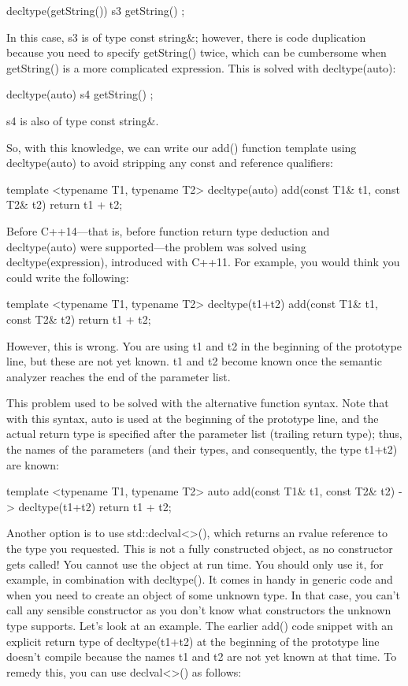 \begin{cpp}
decltype(getString()) s3 { getString() };
\end{cpp}

In this case, s3 is of type const string\&; however, there is code duplication because you need to specify getString() twice, which can be cumbersome when getString() is a more complicated expression. This is solved with decltype(auto):

\begin{cpp}
decltype(auto) s4 { getString() };
\end{cpp}

s4 is also of type const string\&.

So, with this knowledge, we can write our add() function template using decltype(auto) to avoid stripping any const and reference qualifiers:

\begin{cpp}
template <typename T1, typename T2>
decltype(auto) add(const T1& t1, const T2& t2) { return t1 + t2; }
\end{cpp}

Before C++14—that is, before function return type deduction and decltype(auto) were supported—the problem was solved using decltype(expression), introduced with C++11. For example, you would think you could write the following:

\begin{cpp}
template <typename T1, typename T2>
decltype(t1+t2) add(const T1& t1, const T2& t2) { return t1 + t2; }
\end{cpp}

However, this is wrong. You are using t1 and t2 in the beginning of the prototype line, but these are not yet known. t1 and t2 become known once the semantic analyzer reaches the end of the parameter list.

This problem used to be solved with the alternative function syntax. Note that with this syntax, auto is used at the beginning of the prototype line, and the actual return type is specified after the parameter list (trailing return type); thus, the names of the parameters (and their types, and consequently, the type t1+t2) are known:

\begin{cpp}
template <typename T1, typename T2>
auto add(const T1& t1, const T2& t2) -> decltype(t1+t2)
{
    return t1 + t2;
}
\end{cpp}

Another option is to use std::declval<>(), which returns an rvalue reference to the type you requested. This is not a fully constructed object, as no constructor gets called! You cannot use the object at run time. You should only use it, for example, in combination with decltype(). It comes in handy in generic code and when you need to create an object of some unknown type. In that case, you can’t call any sensible constructor as you don’t know what constructors the unknown type supports. Let’s look at an example. The earlier add() code snippet with an explicit return type of decltype(t1+t2) at the beginning of the prototype line doesn’t compile because the names t1 and t2 are not yet known at that time. To remedy this, you can use declval<>() as follows:

